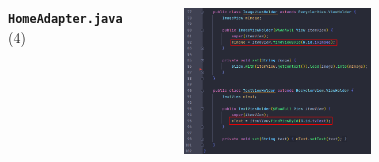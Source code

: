 \documentclass{beamer}
\begin{document}
\begin{frame}
\begin{columns}
\begin{figure}
        \end{figure}
        \indent \textbf{\texttt{HomeAdapter.java}} (4)
        \begin{figure}
            \centering
            \includegraphics[width=\textwidth]{images/21.png}
        \end{figure}
    \end{columns}
\end{frame}
\end{document}
